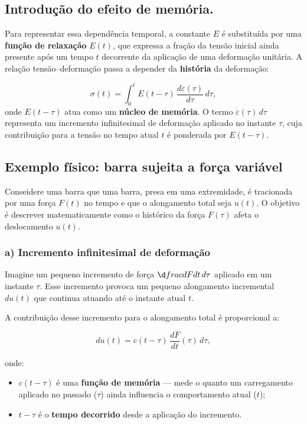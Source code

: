 \subsection{Introdução do efeito de memória.}
Para representar essa dependência temporal, a constante $E$ é substituída por uma \textbf{função de relaxação} $E(t)$, que expressa a fração da tensão inicial ainda presente após um tempo $t$ decorrente da aplicação de uma deformação unitária.   A relação tensão–deformação passa a depender da \textbf{história} da deformação:

\begin{equation}
    \sigma(t) = \int_{0}^{t} E(t - \tau)\,\frac{d\varepsilon(\tau)}{d\tau}\,d\tau,
    \label{conv}
\end{equation}
onde $E(t-\tau)$ atua como um \textbf{núcleo de memória}. O termo $\dot{\varepsilon}(\tau)\,d\tau$ representa um incremento infinitesimal de deformação aplicado no instante $\tau$, cuja contribuição para a tensão no tempo atual $t$ é ponderada por $E(t-\tau)$.


\subsection{Exemplo físico: barra sujeita a força variável}
Conseidere uma barra que uma barra, presa em uma extremidade, é tracionada por uma força $F(t)$ no tempo e que o alongamento total seja $u(t)$.
O objetivo é descrever matematicamente como o histórico da força $F(\tau)$ afeta o deslocamento $u(t)$.

\subsubsection*{a) Incremento infinitesimal de deformação}

Imagine um pequeno incremento de força $\d frac{dF}{dt}\,d\tau$ aplicado em um instante $\tau$. Esse incremento provoca um pequeno alongamento incremental $du(t)$ que continua atuando até o instante atual $t$.

A contribuição desse incremento para o alongamento total é proporcional a:

\begin{equation}
    du(t) = c(t - \tau)\,\frac{dF}{dt}(\tau)\,d\tau,
\end{equation}

onde:
\begin{itemize}
    \item $c(t - \tau)$ é uma \textbf{função de memória} --- mede o quanto um carregamento aplicado no passado ($\tau$) ainda influencia o comportamento atual ($t$);
    \item $t - \tau$ é o \textbf{tempo decorrido} desde a aplicação do incremento.
\end{itemize}

